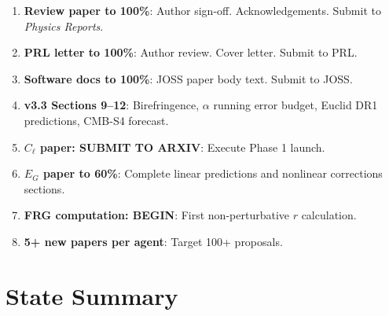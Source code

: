 \documentclass[11pt,a4paper]{article}
\begin{document}
\begin{enumerate}
\item \textbf{Review paper to 100\%}: Author sign-off. Acknowledgements. Submit to \textit{Physics Reports}.
\item \textbf{PRL letter to 100\%}: Author review. Cover letter. Submit to PRL.
\item \textbf{Software docs to 100\%}: JOSS paper body text. Submit to JOSS.
\item \textbf{v3.3 Sections 9--12}: Birefringence, $\alpha$ running error budget, Euclid DR1 predictions, CMB-S4 forecast.
\item \textbf{$C_\ell$ paper: SUBMIT TO ARXIV}: Execute Phase 1 launch.
\item \textbf{$E_G$ paper to 60\%}: Complete linear predictions and nonlinear corrections sections.
\item \textbf{FRG computation: BEGIN}: First non-perturbative $r$ calculation.
\item \textbf{5+ new papers per agent}: Target 100+ proposals.
\end{enumerate}


\section{State Summary}
\end{document}
